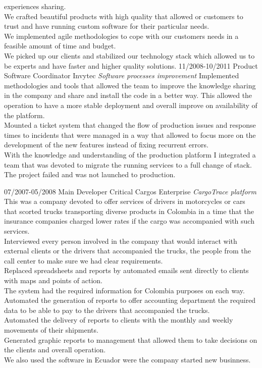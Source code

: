 \begin{entrylist}
{    experiences sharing.\\ We crafted beautiful products with high quality that 
    allowed or customers to trust and have running custom software for their 
    particular needs.\\  We implemented agile methodologies to cope with our
    customers needs in a feasible amount of time and budget.\\ We picked up our
    clients and stabilized our technology stack which allowed us to be experts and
    have faster and higher quality solutions.
    }
    \entry
    {11/2008-10/2011}
    {Product Software Coordinator}
    {Invytec {\sl Software processes improvement}}
    {Implemented methodologies and tools that allowed the team to improve the 
    knowledge sharing in the company and share and install the code in a 
    better way.  This allowed the operation to have a more stable deployment and 
    overall improve on availability of the platform.\\ Mounted a ticket system 
    that changed the flow of production issues and response times to incidents 
    that were managed in a way that allowed to focus more on the development of 
    the new features instead of fixing recurrent errors.\\ With the knowledge 
    and understanding of the production platform I integrated a team that was 
    devoted to migrate the running services to a full change of stack.  The 
    project failed and was not launched to production.
    }
  \end{entrylist}
  
  \newpage

  \begin{entrylist}
  \entry
    {07/2007-05/2008}
    {Main Developer}
    {Critical Cargos Enterprise {\sl CargoTrace platform}}
    {This was a company devoted to offer services of drivers in motorcycles or 
    cars that scorted trucks transporting diverse products in Colombia in a 
    time that the insurance companies charged lower rates if the cargo was 
    accompanied with such services.\\Interviewed every person involved in the 
    company that would interact with external clients or the drivers that 
    accompanied the trucks, the people from the call center to make sure we 
    had clear requirements.\\ Replaced spreadsheets and reports by automated 
    emails sent directly to clients with maps and points of action.\\ The system 
    had the required information for Colombia purposes on each way.\\ Automated 
    the generation of reports to offer accounting department the required data 
    to be able to pay to the drivers that accompanied the trucks.\\ Automated 
    the delivery of reports to clients with the monthly and weekly movements 
    of their shipments.\\ Generated graphic reports to management that allowed 
    them to take decisions on the clients and overall operation.\\ We also used 
    the software in Ecuador were the company started new businness.}
\end{entrylist}
